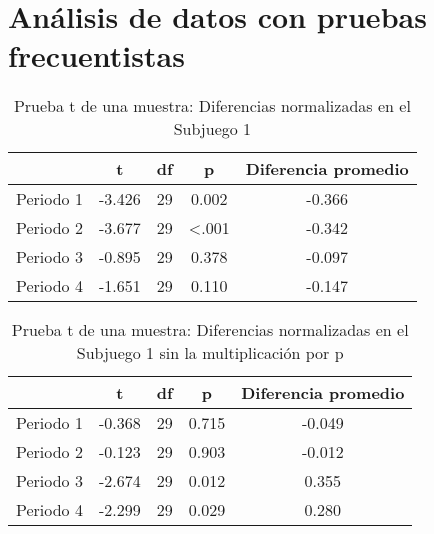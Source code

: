 
\chapter{Análisis de datos con pruebas frecuentistas} %

\label{App_Data} %



\begin{table}[h]
\caption[Prueba t de una muestra: Diferencias normalizadas en el Subjuego 1]{Prueba t de una muestra: Diferencias normalizadas en el Subjuego 1}
\label{DN-S1}
\centering
\begin{tabular}{l | c c c | c}
\toprule
\textbf{} & \textbf{t} & \textbf{df} & \textbf{p} & \textbf{Diferencia promedio}\\
\midrule
Periodo 1 & -3.426 & 29 & 0.002 & -0.366\\
Periodo 2 & -3.677 & 29 & <.001 & -0.342\\
Periodo 3 & -0.895 & 29 & 0.378 & -0.097\\
Periodo 4 & -1.651 & 29 & 0.110 & -0.147\\
\bottomrule
\end{tabular}
\end{table}







\begin{table}[h]
\caption[Prueba t de una muestra: Diferencias normalizadas en el Subjuego 1 sin la multiplicación por $p$]{Prueba t de una muestra: Diferencias normalizadas en el Subjuego 1 sin la multiplicación por p}
\label{DN-S1}
\centering
\begin{tabular}{l | c c c | c}
\toprule
\textbf{} & \textbf{t} & \textbf{df} & \textbf{p} & \textbf{Diferencia promedio}\\
\midrule
Periodo 1 & -0.368 & 29 & 0.715 & -0.049\\
Periodo 2 & -0.123 & 29 & 0.903 & -0.012\\
Periodo 3 & -2.674 & 29 & 0.012 & 0.355\\
Periodo 4 & -2.299 & 29 & 0.029 & 0.280\\
\bottomrule
\end{tabular}
\end{table}










